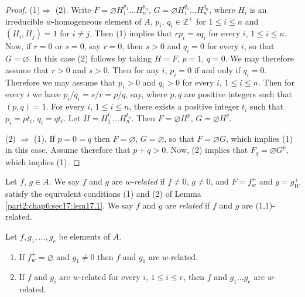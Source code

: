 \begin{proof}
  (1)\pageoriginale $\Rightarrow$ (2). Write $F= \diameter H_1^{p_1}\ldots
  H_n^{p_n}$, $G= \diameter H_1^{q_1}\ldots H_n^{q_n}$, where $H_i$ is
  an irreducible $w$-homogeneous element of $A$, $p_i$, $q_i \in
  \mathbb{Z}^+$ for $1 \leq i \leq n$ and \gcd $(H_i, H_j)= 1$ for $i
  \neq j$. Then (1) implies that $rp_i= sq_i$ for every $i$, $1 \leq i
  \leq n$. Now, if $r=0$ or $s=0$, say $r=0$, then $s> 0$ and $q_i =0$
  for every $i$, so that $G = \diameter$. In this case (2) follows by
  taking $H= F$, $p=1$, $q=0$. We may therefore assume that $r> 0$ and
  $s> 0$. Then for any $i$, $p_i=0$ if and only if $q_i =0$. Therefore
  we may assume that $p_i > 0$ and $q_i > 0$ for every $i$, $1 \leq i
  \leq n$. Then for every $i$ we have $p_i/ q_i= s/r= p/q$, say, where
  $p, q$ are positive integers such that \gcd $(p, q)=1$. For every
  $i$, $1 \leq i \leq n$, there exists a positive integer $t_i$ such
  that $p_i= p t_i$, $q_i = qt_i$. Let $H= H_1^{t_1} \ldots
  H_n^{t_n}$. Then $F= \diameter H^p$, $G= \diameter H^q$. 

(2) $\Rightarrow$ (1). If $p=0=q$ then $F = \diameter$, $G=
  \diameter$, so that $F= \diameter G$, which implies (1) in this
  case. Assume therefore that $p+q> 0$. Now, (2) implies that $F_q =
  \diameter G^p$, which implies (1).
\end{proof}

\begin{defi}\label{part2:chap6:sec17:def17.2}
  Let $f$, $g \in A$. We say $f$ and $g$ are $w$-{\em related} if $f
  \neq 0$, $g\neq 0$, and $F = f_w^+$ and $g= g_W^+$ satisfy the
  equivalent conditions (1) and (2) of  Lemma
  \ref{part2:chap6:sec17:lem17.1}. We say $f$ and $g$ are {\em
    related} if $f$ and $g$ are (1,1)-related. 
\end{defi}

\begin{lemma}\label{part2:chap6:sec17:lem17.3}
  Let $f, g_1 , \ldots, g_e$ be elements of $A$.
  \begin{enumerate}[\rm (i)]
    \item If $f_w^+= \diameter$ and $g_1 \neq 0$ then $f$ and $g_1$
      are $w$-related.
      \item If $f$ and $g_i$ are $w$-related for every $i$, $1 \leq i
        \leq e$, then $f$ and $g_1 \ldots g_e$ are $w$-related.
  \end{enumerate}
\end{lemma}

